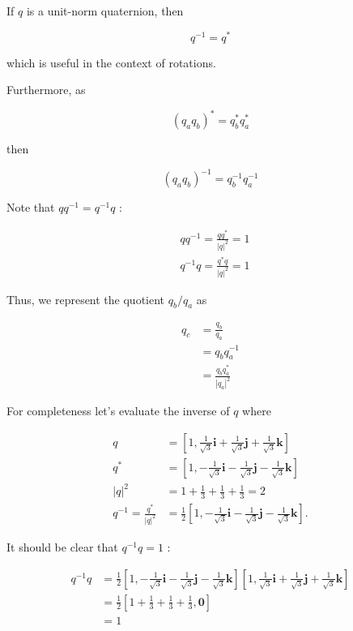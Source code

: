 \documentclass[10pt]{article}
\begin{document}
If $q$ is a unit-norm quaternion, then

$$
q^{-1}=q^{*}
$$

which is useful in the context of rotations.

Furthermore, as

$$
\left(q_{a} q_{b}\right)^{*}=q_{b}^{*} q_{a}^{*}
$$

then

$$
\left(q_{a} q_{b}\right)^{-1}=q_{b}^{-1} q_{a}^{-1}
$$

Note that $q q^{-1}=q^{-1} q$ :

$$
\begin{aligned}
& q q^{-1}=\frac{q q^{*}}{|q|^{2}}=1 \\
& q^{-1} q=\frac{q^{*} q}{|q|^{2}}=1
\end{aligned}
$$

Thus, we represent the quotient $q_{b} / q_{a}$ as

$$
\begin{aligned}
q_{c} & =\frac{q_{b}}{q_{a}} \\
& =q_{b} q_{a}^{-1} \\
& =\frac{q_{b} q_{a}^{*}}{\left|q_{a}\right|^{2}}
\end{aligned}
$$

For completeness let's evaluate the inverse of $q$ where

$$
\begin{aligned}
q & =\left[1, \frac{1}{\sqrt{3}} \mathbf{i}+\frac{1}{\sqrt{3}} \mathbf{j}+\frac{1}{\sqrt{3}} \mathbf{k}\right] \\
q^{*} & =\left[1,-\frac{1}{\sqrt{3}} \mathbf{i}-\frac{1}{\sqrt{3}} \mathbf{j}-\frac{1}{\sqrt{3}} \mathbf{k}\right] \\
|q|^{2} & =1+\frac{1}{3}+\frac{1}{3}+\frac{1}{3}=2 \\
q^{-1}=\frac{q^{*}}{|q|^{2}} & =\frac{1}{2}\left[1,-\frac{1}{\sqrt{3}} \mathbf{i}-\frac{1}{\sqrt{3}} \mathbf{j}-\frac{1}{\sqrt{3}} \mathbf{k}\right] .
\end{aligned}
$$

It should be clear that $q^{-1} q=1$ :

$$
\begin{aligned}
q^{-1} q & =\frac{1}{2}\left[1,-\frac{1}{\sqrt{3}} \mathbf{i}-\frac{1}{\sqrt{3}} \mathbf{j}-\frac{1}{\sqrt{3}} \mathbf{k}\right]\left[1, \frac{1}{\sqrt{3}} \mathbf{i}+\frac{1}{\sqrt{3}} \mathbf{j}+\frac{1}{\sqrt{3}} \mathbf{k}\right] \\
& =\frac{1}{2}\left[1+\frac{1}{3}+\frac{1}{3}+\frac{1}{3}, \mathbf{0}\right] \\
& =1
\end{aligned}
$$
\end{document}
